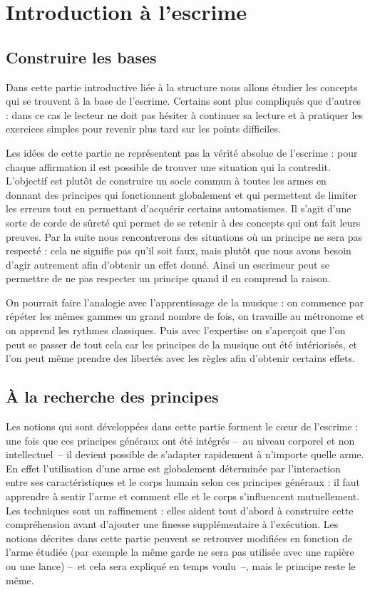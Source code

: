 \chapter{Introduction à l'escrime}


\section{Construire les bases}


Dans cette partie introductive liée à la structure nous allons étudier les concepts qui se trouvent à la base de l'escrime.
Certains sont plus compliqués que d'autres : dans ce cas le lecteur ne doit pas hésiter à continuer sa lecture et à pratiquer les exercices simples pour revenir plus tard sur les points difficiles.

Les idées de cette partie ne représentent pas la vérité absolue de l'escrime : pour chaque affirmation il est possible de trouver une situation qui la contredit.
L'objectif est plutôt de construire un socle commun à toutes les armes en donnant des principes qui fonctionnent globalement et qui permettent de limiter les erreurs tout en permettant d'acquérir certains automatismes.
Il s'agit d'une sorte de corde de sûreté qui permet de se retenir à des concepts qui ont fait leurs preuves.
Par la suite nous rencontrerons des situations où un principe ne sera pas respecté : cela ne signifie pas qu'il soit faux, mais plutôt que nous avons besoin d'agir autrement afin d'obtenir un effet donné.
Ainsi un escrimeur peut se permettre de ne pas respecter un principe quand il en comprend la raison.

On pourrait faire l'analogie avec l'apprentissage de la musique : on commence par répéter les mêmes gammes un grand nombre de fois, on travaille au métronome et on apprend les rythmes classiques.
Puis avec l'expertise on s'aperçoit que l'on peut se passer de tout cela car les principes de la musique ont été intériorisés, et l'on peut même prendre des libertés avec les règles afin d'obtenir certains effets.


\section{À la recherche des principes}


Les notions qui sont développées dans cette partie forment le cœur de l'escrime : une fois que ces principes généraux ont été intégrés -- au niveau corporel et non intellectuel -- il devient possible de s'adapter rapidement à n'importe quelle arme.
En effet l'utilisation d'une arme est globalement déterminée par l'interaction entre ses caractéristiques et le corps humain selon ces principes généraux : il faut apprendre à sentir l'arme et comment elle et le corps s'influencent mutuellement.
Les techniques sont un raffinement : elles aident tout d'abord à construire cette compréhension avant d'ajouter une finesse supplémentaire à l'exécution.
Les notions décrites dans cette partie peuvent se retrouver modifiées en fonction de l'arme étudiée (par exemple la même garde ne sera pas utilisée avec une rapière ou une lance) -- et cela sera expliqué en temps voulu --, mais le principe reste le même.


